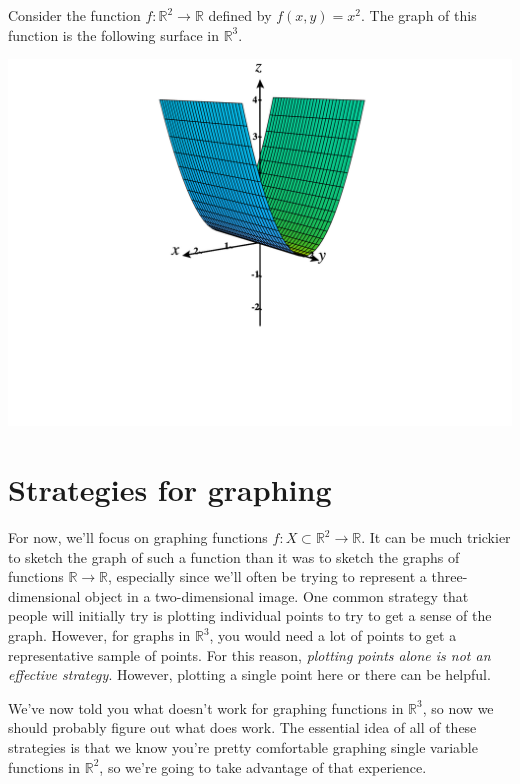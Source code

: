 \documentclass{ximera}
\begin{document}
\begin{example}
Consider the function $f:\mathbb{R}^2\rightarrow\mathbb{R}$ defined by $f(x,y) = x^2$. The graph of this function is the following surface in $\mathbb{R}^3$.

\begin{image}
\includegraphics[width = \textwidth]{CalcPlot3D-x2}
\end{image}
\end{example}

\section*{Strategies for graphing}

For now, we'll focus on graphing functions $f:X\subset\mathbb{R}^2\rightarrow\mathbb{R}$. It can be much trickier to sketch the graph of such a function than it was to sketch the graphs of functions $\mathbb{R}\rightarrow\mathbb{R}$, especially since we'll often be trying to represent a three-dimensional object in a two-dimensional image. One common strategy that people will initially try is plotting individual points to try to get a sense of the graph. However, for graphs in $\mathbb{R}^3$, you would need a lot of points to get a representative sample of points. For this reason, \emph{plotting points alone is not an effective strategy}. However, plotting a single point here or there can be helpful.

We've now told you what doesn't work for graphing functions in $\mathbb{R}^3$, so now we should probably figure out what does work. The essential idea of all of these strategies is that we know you're pretty comfortable graphing single variable functions in $\mathbb{R}^2$, so we're going to take advantage of that experience.
\end{document}
